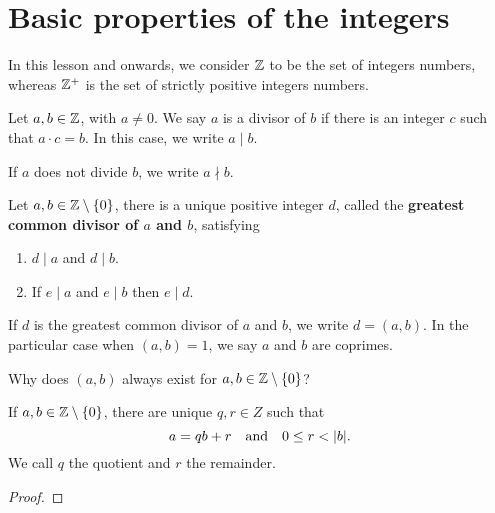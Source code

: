 \documentclass[11pt,a4paper]{article}
\begin{document}
\def\contador{1}


\section{Basic properties of the integers}

In this lesson and onwards, we consider $\mathbb{Z}$ to be the set of integers numbers, whereas $\mathbb{Z}^{+}$ is the set of strictly positive integers numbers.

\begin{defi}
Let $a,b\in \mathbb{Z}$, with $a\neq 0$. We say  $a$ is a divisor of $b$ if there is an integer $c$ such that $a\cdot c=b$. In this case, we write $a\mid b.$ 
\end{defi}

\begin{rem}
    If $a$ does not divide $b$, we write $a\nmid b$.
\end{rem}

\begin{teo}
    Let $a,b\in \mathbb{Z}\setminus\{0\}$, there is a unique positive integer $d$, called the \textbf{greatest common divisor of $a$ and $b$}, satisfying 
    \begin{enumerate}
        \item $d\mid a$ and $d\mid b.$
        \item If $e\mid a$ and $e\mid b$ then $e\mid d.$
    \end{enumerate}
\end{teo}

\begin{rem}
    If $d$ is the greatest common divisor of $a$ and $b$, we write $d=(a,b).$
    In the  particular case when  $(a,b)=1$, we say  $a$ and $b$ are coprimes.
\end{rem}

\begin{que}
    Why does $(a,b)$ always exist for $a,b\in \mathbb{Z}\setminus\{0\}$?
\end{que}


\begin{teo}
    If \(a,b\in \mathbb{Z}\setminus\{0\}\), 
    there are unique \(q,r\in Z\)
    such that 
    \[a= qb +r \quad\text{and}\quad 0\leq r < |b|.\]
    We call \(q\) the quotient and \(r\) the remainder.
\end{teo}

\begin{proof}
    
\end{proof}
\end{document}
